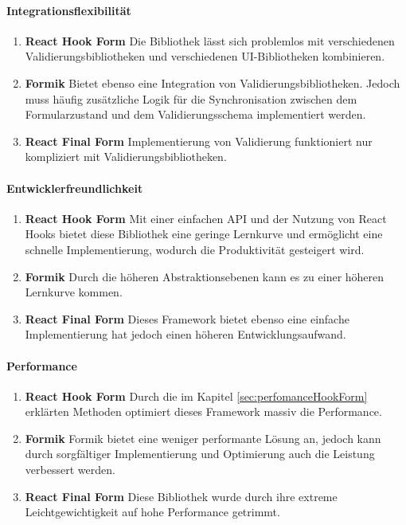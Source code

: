\paragraph{Integrationsflexibilität}
\begin{enumerate}
	\item \textbf{React Hook Form} Die Bibliothek lässt sich problemlos mit verschiedenen Validierungsbibliotheken und verschiedenen UI-Bibliotheken kombinieren. 
	
	\item \textbf{Formik} Bietet ebenso eine Integration von Validierungsbibliotheken. Jedoch muss häufig zusätzliche Logik für die Synchronisation zwischen dem Formularzustand und dem Validierungsschema implementiert werden.
	
	\item \textbf{React Final Form} Implementierung von Validierung funktioniert nur kompliziert mit Validierungsbibliotheken.
\end{enumerate}

\paragraph{Entwicklerfreundlichkeit}
\begin{enumerate}
	\item \textbf{React Hook Form} Mit einer einfachen API und der Nutzung von React Hooks bietet diese Bibliothek eine geringe Lernkurve und ermöglicht eine schnelle Implementierung, wodurch die Produktivität gesteigert wird. 
	
	\item \textbf{Formik} Durch die höheren Abstraktionsebenen kann es zu einer höheren Lernkurve kommen. 
	
	\item \textbf{React Final Form} Dieses Framework bietet ebenso eine einfache Implementierung hat jedoch einen höheren Entwicklungsaufwand.
\end{enumerate}

\paragraph{Performance}
\begin{enumerate}
	\item \textbf{React Hook Form} Durch die im Kapitel \ref{sec:perfomanceHookForm} erklärten Methoden optimiert dieses Framework massiv die Performance. 
	
	\item \textbf{Formik} Formik bietet eine weniger performante Lösung an, jedoch kann durch sorgfältiger Implementierung und Optimierung auch die Leistung verbessert werden.
	
	\item \textbf{React Final Form} Diese Bibliothek wurde durch ihre extreme Leichtgewichtigkeit auf hohe Performance getrimmt.  
\end{enumerate}


